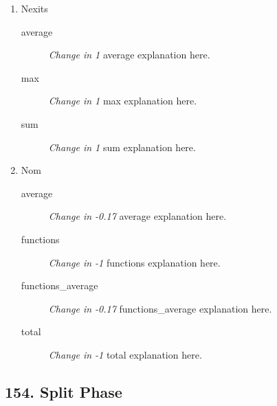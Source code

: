 \begin{enumerate}
\begin{description}
            \end{description}
      \item Nexits
            \begin{description}
                  \item [average] \textit{Change in 1} average explanation here.
                  \item [max] \textit{Change in 1} max explanation here.
                  \item [sum] \textit{Change in 1} sum explanation here.
            \end{description}
      \item Nom
            \begin{description}
                  \item [average] \textit{Change in -0.17} average explanation here.
                  \item [functions] \textit{Change in -1} functions explanation here.
                  \item [functions\_average] \textit{Change in -0.17} functions\_average explanation here.
                  \item [total] \textit{Change in -1} total explanation here.
            \end{description}
\end{enumerate}
\subsection{ 154.  Split Phase }

